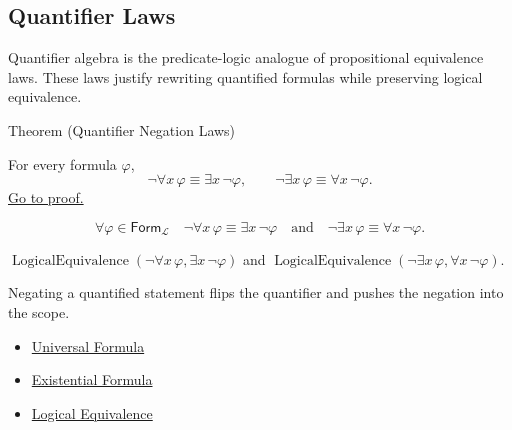 
\subsection*{Quantifier Laws}

\begin{remark*}
Quantifier algebra is the predicate-logic analogue of propositional
equivalence laws. These laws justify rewriting quantified formulas while
preserving logical equivalence.
\end{remark*}

\begin{theorembox}{Theorem (Quantifier Negation Laws)}
\begin{theorem}
\label{thm:qneg}
For every formula \(\varphi\),
\[
\neg\forall x\,\varphi \equiv \exists x\,\neg\varphi,
\qquad
\neg\exists x\,\varphi \equiv \forall x\,\neg\varphi.
\]
\hyperref[prf:qneg]{Go to proof.}
\end{theorem}
\end{theorembox}

\begin{remark*}
\[
\forall \varphi\in\mathsf{Form}_{\mathcal L}\quad
\neg\forall x\,\varphi \equiv \exists x\,\neg\varphi
\quad\text{and}\quad
\neg\exists x\,\varphi \equiv \forall x\,\neg\varphi.
\]
\end{remark*}

\begin{remark*}
\(\operatorname{LogicalEquivalence}(\neg\forall x\,\varphi,\exists x\,\neg\varphi)\)
and
\(\operatorname{LogicalEquivalence}(\neg\exists x\,\varphi,\forall x\,\neg\varphi)\).
\end{remark*}

\begin{remark*}[Interpretation]
Negating a quantified statement flips the quantifier and pushes the negation
into the scope.
\end{remark*}

\begin{dependencies}
\begin{itemize}
  \item \hyperref[def:universal-q]{Universal Formula}
  \item \hyperref[def:existential-q]{Existential Formula}
  \item \hyperref[def:log-equiv]{Logical Equivalence}
\end{itemize}
\end{dependencies}

